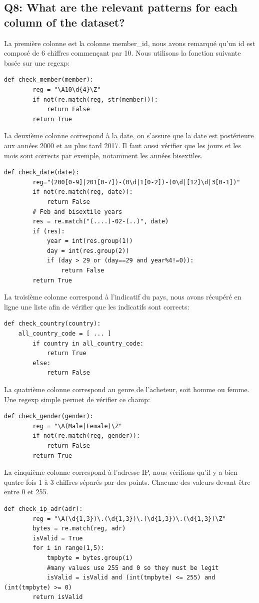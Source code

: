 \documentclass[11pt]{article}
\begin{document}
\subsection*{Q8: What are the relevant patterns for each column of the dataset?}
	La première colonne est la colonne member\_id, nous avons remarqué qu'un
	id est composé de 6 chiffres commençant par 10. Nous utilisons la 
	fonction suivante basée sur une regexp:
	\begin{lstlisting}[style=myPython]
	def check_member(member):
		reg = "\A10\d{4}\Z"
		if not(re.match(reg, str(member))):
			return False
		return True
	\end{lstlisting} 
	La deuxième colonne correspond à la date, on s'assure que la date est
	postérieure aux années 2000 et au plus tard 2017. Il faut aussi
	vérifier que les jours et les mois sont corrects par exemple,
	notamment les années bisextiles.
	\begin{lstlisting}[style=myPython]
	def check_date(date):
		reg="(200[0-9]|201[0-7])-(0\d|1[0-2])-(0\d|[12]\d|3[0-1])"
		if not(re.match(reg, date)):
			return False
		# Feb and bisextile years
		res = re.match("(....)-02-(..)", date)
		if (res):
			year = int(res.group(1))
			day = int(res.group(2))
			if (day > 29 or (day==29 and year%4!=0)):
				return False
		return True
	\end{lstlisting}
	La troisième colonne correspond à l'indicatif du pays, nous avons 
	récupéré en ligne une liste \cite{indicPays} afin de vérifier que
	les indicatifs sont corrects:
	\begin{lstlisting}[style=myPython]
	def check_country(country):
	all_country_code = [ ... ]
		if country in all_country_code:
			return True
		else:
			return False
	\end{lstlisting}
	La quatrième colonne correspond au genre de l'acheteur, soit homme
	ou femme. Une regexp simple permet de vérifier ce champ:
	\begin{lstlisting}[style=myPython]
	def check_gender(gender):
		reg = "\A(Male|Female)\Z"
		if not(re.match(reg, gender)):
			return False
		return True
	\end{lstlisting}
	La cinquième colonne correspond à l'adresse IP, nous vérifions
	qu'il y a bien quatre fois 1 à 3 chiffres séparés par des points.
	Chacune des valeurs devant être entre 0 et 255. 
	\begin{lstlisting}[style=myPython]
	def check_ip_adr(adr):
		reg = "\A(\d{1,3})\.(\d{1,3})\.(\d{1,3})\.(\d{1,3})\Z"
		bytes = re.match(reg, adr)
		isValid = True
		for i in range(1,5):
			tmpbyte = bytes.group(i)
			#many values use 255 and 0 so they must be legit
			isValid = isValid and (int(tmpbyte) <= 255) and (int(tmpbyte) >= 0)
		return isValid
	\end{lstlisting}
\end{document}
